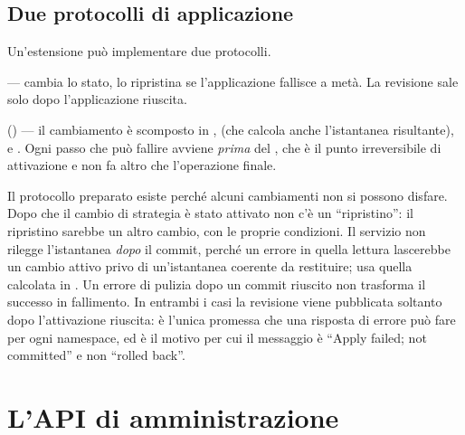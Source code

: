 \subsection{Due protocolli di applicazione}

Un'estensione pu\`o implementare due protocolli.

\begin{description}[style=nextline, leftmargin=0pt]
  \item[\textbf{Legacy}] ---  cambia lo stato,  lo
  ripristina se l'applicazione fallisce a met\`a. La revisione sale solo dopo
  l'applicazione riuscita.
  \item[\textbf{Preparato}] () --- il
  cambiamento \`e scomposto in ,  (che calcola
  anche l'istantanea risultante),  e . Ogni passo che
  pu\`o fallire avviene \emph{prima} del , che \`e il punto
  irreversibile di attivazione e non fa altro che l'operazione finale.
\end{description}

Il protocollo preparato esiste perch\'e alcuni cambiamenti non si possono
disfare. Dopo che il cambio di strategia \`e stato attivato non c'\`e un
``ripristino'': il ripristino sarebbe un altro cambio, con le proprie condizioni.
Il servizio non rilegge l'istantanea \emph{dopo} il commit, perch\'e un errore in
quella lettura lascerebbe un cambio attivo privo di un'istantanea coerente da
restituire; usa quella calcolata in . Un errore di pulizia dopo un
commit riuscito non trasforma il successo in fallimento. In entrambi i casi la
revisione viene pubblicata soltanto dopo l'attivazione riuscita: \`e l'unica
promessa che una risposta di errore pu\`o fare per ogni namespace, ed \`e il
motivo per cui il messaggio \`e ``Apply failed; not committed'' e non ``rolled
back''.

\section{L'API di amministrazione}

